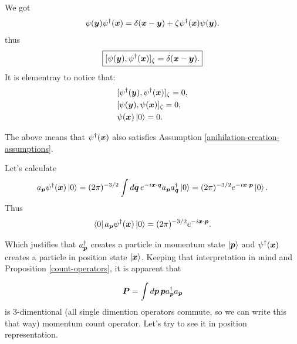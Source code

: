 \documentclass[main.tex]{subfiles}
\begin{document}
We got 
\begin{equation}
\psi(\boldsymbol{y})\psi^\dagger(\boldsymbol{x}) = \delta(\boldsymbol{x} - \boldsymbol{y}) + \zeta \psi^\dagger(\boldsymbol{x}) \psi(\boldsymbol{y}).
\end{equation}
thus
\begin{equation}
\boxed{
[\psi(\boldsymbol{y}), \psi^\dagger(\boldsymbol{x})]_\zeta = \delta(\boldsymbol{x} - \boldsymbol{y}). 
}
\end{equation}
It is elementray to notice that:
\begin{align*}
&[\psi^\dagger(\boldsymbol{y}), \psi^\dagger(\boldsymbol{x})]_\zeta = 0,\\
&[\psi(\boldsymbol{y}), \psi(\boldsymbol{x})]_\zeta = 0,\\
&\psi(\boldsymbol{x}) \ket{0} = 0.
\end{align*}

The above means that $\psi^\dagger(\boldsymbol{x})$ also satisfies Assumption \ref{anihilation-creation-assumptions}.

Let's calculate
\begin{align*}
a_{\boldsymbol{p}} \psi^\dagger(\boldsymbol{x})\ket{0} = (2\pi)^{-3/2}\int d\boldsymbol{q}\, e^{-i\boldsymbol{x}\cdot \boldsymbol{q}} a_{\boldsymbol{p}} a^\dagger_{\boldsymbol{q}} \ket{0} = (2\pi)^{-3/2} e^{-i\boldsymbol{x}\cdot \boldsymbol{p}} \ket{0}. 
\end{align*}
Thus
\begin{equation}
\bra{0} a_{\boldsymbol{p}} \psi^\dagger(\boldsymbol{x})\ket{0} = (2\pi)^{-3/2} e^{-i\boldsymbol{x}\cdot \boldsymbol{p}}.
\end{equation}

Which justifies that $a^\dagger_{\boldsymbol{p}}$ creates a particle in momentum state $\ket{\boldsymbol{p}}$ and $\psi^\dagger(\boldsymbol{x})$ creates a particle in position state $\ket{\boldsymbol{x}}$. Keeping that interpretation in mind and Proposition \ref{count-operators}, it is apparent that

\begin{equation}
\boldsymbol{P} = \int d\boldsymbol{p}\, \boldsymbol{p}a^\dagger_{\boldsymbol{p}}a_{\boldsymbol{p}}
\end{equation} 
is $3$-dimentional (all single dimention operators commute, so we can write this that way) momentum count operator. Let's try to see it in position representation.
\end{document}
